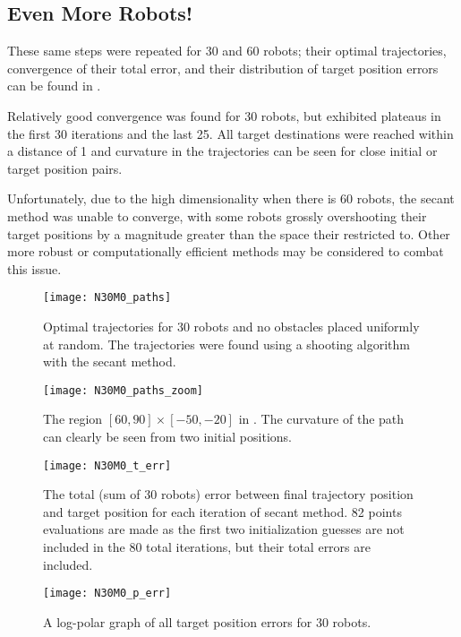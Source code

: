 \documentclass[11pt]{article}
\begin{document}
\subsection{Even More Robots!}

These same steps were repeated for 30 and 60 robots; their optimal trajectories, convergence of their total error, and their distribution of target position errors can be found in .

Relatively good convergence was found for 30 robots, but exhibited plateaus in the first 30 iterations and the last 25. All target destinations were reached within a distance of 1 and curvature in the trajectories can be seen for close initial or target position pairs.

Unfortunately, due to the high dimensionality when there is 60 robots, the secant method was unable to converge, with some robots grossly overshooting their target positions by a magnitude greater than the space their restricted to. Other more robust or computationally efficient methods may be considered to combat this issue.

\begin{figure}
	\centering
	\texttt{[image: N30M0\_paths]}
	\caption{Optimal trajectories for 30 robots and no obstacles placed uniformly at random. The trajectories were found using a shooting algorithm with the secant method.}
	\label{fig:n30m0-paths}
\end{figure}

\begin{figure}
	\centering
	\texttt{[image: N30M0\_paths\_zoom]}
	\caption{The region \([60,90] \times [-50,-20]\) in . The curvature of the path can clearly be seen from two initial positions.}
	\label{fig:n30m0-paths-zoom}
\end{figure}

\begin{figure}
	\centering
	\texttt{[image: N30M0\_t\_err]}
	\caption{The total (sum of 30 robots) error between final trajectory position and target position for each iteration of secant method. 82 points evaluations are made as the first two initialization guesses are not included in the 80 total iterations, but their total errors are included.}
	\label{fig:n30m0-t-err}
\end{figure}

\begin{figure}
	\centering
	\texttt{[image: N30M0\_p\_err]}
	\caption{A log-polar graph of all target position errors for 30 robots.}
	\label{fig:n30m0-p-err}
\end{figure}
\end{document}
